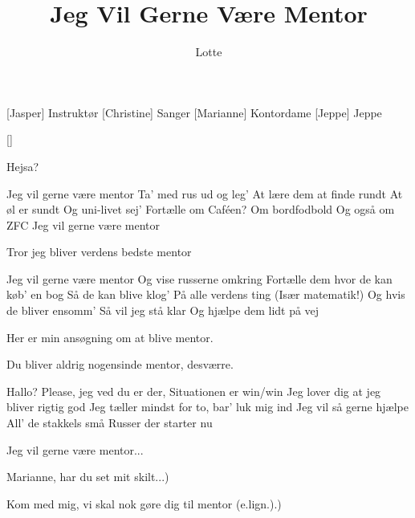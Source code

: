 \documentclass[a4paper,11pt]{article}
\title{Jeg Vil Gerne Være Mentor}
\author{Lotte}
\begin{document}
\maketitle

\begin{roles}
[Jasper] Instruktør
[Christine] Sanger
[Marianne] Kontordame
[Jeppe] Jeppe
\end{roles}

\begin{props}
[]
\end{props}

\begin{song}

 Hejsa?

 Jeg vil gerne være mentor
Ta' med rus ud og leg'
At lære dem at finde rundt
At øl er sundt
Og uni-livet sej'
Fortælle om Caféen?
Om bordfodbold
Og også om ZFC
Jeg vil gerne være mentor


 Tror jeg bliver verdens bedste mentor


 Jeg vil gerne være mentor
Og vise russerne omkring
Fortælle dem hvor de kan køb' en bog
Så de kan blive klog'
På alle verdens ting
(Især matematik!)
Og hvis de bliver ensomm'
Så vil jeg stå klar
Og hjælpe dem lidt på vej


 Her er min ansøgning om at blive mentor.


 Du bliver aldrig nogensinde mentor, desværre.

 Hallo?
Please, jeg ved du er der,
Situationen er win/win
Jeg lover dig at jeg bliver rigtig god
Jeg tæller mindst for to, bar' luk mig ind
Jeg vil så gerne hjælpe
All' de stakkels små
Russer der starter nu

Jeg vil gerne være mentor...


 Marianne, har du set mit skilt...)


 Kom med mig, vi skal nok gøre dig til mentor (e.lign.).)

\end{song}
\end{document}
